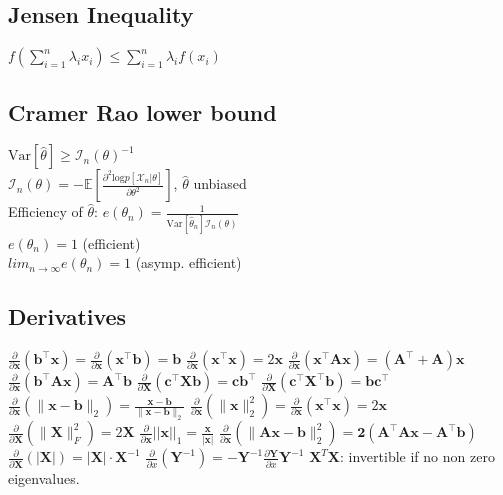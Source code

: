 \subsection*{Jensen Inequality}
$f(\sum_{i=1}^n \lambda_i x_i) \leq \sum_{i=1}^n \lambda_i f(x_i)$

\subsection*{Cramer Rao lower bound}
$\mathrm{Var}[\hat{\theta}]\geq \mathcal{I}_n(\theta)^{-1}$\\
$\mathcal{I}_n(\theta) = -\mathbb{E}[\frac{\partial^2 \mathrm{log}p[\mathcal{X}_n|\theta]}{\partial \theta^2}]$, $\hat{\theta}$ unbiased\\
Efficiency of $\hat{\theta}$: $e(\theta_n)=\frac{1}{\mathrm{Var}[\hat{\theta}_n]\mathcal{I}_n(\theta)}$\\
$e(\theta_n) = 1$ (efficient)\\
$lim_{n\rightarrow\infty}e(\theta_n) = 1$ (asymp. efficient)

\subsection*{Derivatives}
$\frac{\partial}{\partial \mathbf{x}}(\mathbf{b}^\top \mathbf{x}) = \frac{\partial}{\partial \mathbf{x}}(\mathbf{x}^\top \mathbf{b}) = \mathbf{b}$ \quad
$\frac{\partial}{\partial \mathbf{x}}(\mathbf{x}^\top \mathbf{x}) = 2\mathbf{x}$ \quad
$\frac{\partial}{\partial \mathbf{x}}(\mathbf{x}^\top \mathbf{A}\mathbf{x}) = (\mathbf{A}^\top + \mathbf{A})\mathbf{x}$ \quad
$\frac{\partial}{\partial \mathbf{x}}(\mathbf{b}^\top \mathbf{A}\mathbf{x}) = \mathbf{A}^\top \mathbf{b}$ \quad
$\frac{\partial}{\partial \mathbf{X}}(\mathbf{c}^\top \mathbf{X} \mathbf{b}) = \mathbf{c}\mathbf{b}^\top$ \quad
$\frac{\partial}{\partial \mathbf{X}}(\mathbf{c}^\top \mathbf{X}^\top \mathbf{b}) = \mathbf{b}\mathbf{c}^\top$ \quad
$\frac{\partial}{\partial \mathbf{x}}(\| \mathbf{x}-\mathbf{b} \|_2) = \frac{\mathbf{x}-\mathbf{b}}{\|\mathbf{x}-\mathbf{b}\|_2}$ \quad
$\frac{\partial}{\partial \mathbf{x}}(\|\mathbf{x}\|^2_2) = \frac{\partial}{\partial \mathbf{x}} (\mathbf{x}^\top \mathbf{x}) = 2\mathbf{x}$ \quad
$\frac{\partial}{\partial \mathbf{X}}(\|\mathbf{X}\|_F^2) = 2\mathbf{X}$  \quad $\frac{\partial}{\partial \mathbf{x}}||\mathbf{x}||_1 = \frac{\mathbf{x}}{|\mathbf{x}|}$ \quad
$\frac{\partial}{\partial \mathbf{x}}(\|\mathbf{Ax - b}\|_2^2) = \mathbf{2(A^\top Ax-A^\top b)}$ \quad
$\frac{\partial}{\partial \mathbf{X}}(|\mathbf{X}|) = |\mathbf{X}|\cdot \mathbf{X}^{-1}$ \quad $\frac{\partial}{\partial x}(\mathbf{Y}^{-1}) = -\mathbf{Y}^{-1} \frac{\partial\mathbf{Y}}{\partial x} \mathbf{Y}^{-1}$
$\mathbf{X}^T\mathbf{X}$: invertible if no non zero eigenvalues.


